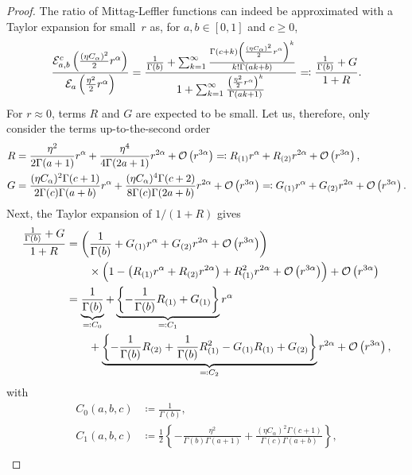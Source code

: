 \begin{proof}
The ratio of Mittag-Leffler functions can indeed be approximated with a Taylor expansion for small~$r$ as, for $a, b \in [0,1]$ and $c \geq 0$,
\[
\frac{\mathcal{E}_{a, b}^{c} \left(\frac{(\eta C_{\alpha})^2}2 r^\alpha\right)}{\mathcal{E}_a\left(\frac{\eta^2}2 r^\alpha\right)} = \frac{\frac{1}{\Gamma(b)} + \sum^{\infty}_{k=1}\frac{\Gamma(c+k) \left(\frac{(\eta C_{\alpha})^2}2 r^\alpha\right)^k}{k!\Gamma(ak+b)}}{1 + \sum^{\infty}_{k=1}\frac{\left(\frac{\eta^2}2 r^\alpha\right)^k}{\Gamma(ak+1)}} \eqqcolon \frac{\frac{1}{\Gamma(b)} + G}{1 + R}. 
\]
For $r \approx 0$, terms $R$ and $G$ are expected to be small. Let us, therefore, only consider the terms up-to-the-second order
\begin{align}
    R &= \frac{\eta^2}{2\Gamma(a+1)} r^\alpha + \frac{\eta^4}{4\Gamma(2a+1)}r^{2\alpha} + \mathcal{O}\left(r^{3\alpha}\right) \eqqcolon R_{(1)}r^\alpha + R_{(2)}r^{2\alpha} + \mathcal{O}\left(r^{3\alpha}\right), \\
    G &= \frac{(\eta C_{\alpha})^2 \Gamma(c+1)}{2\Gamma(c)\Gamma(a+b)} r^\alpha + \frac{(\eta C_{\alpha})^4 \Gamma(c+2)}{8 \Gamma(c) \Gamma(2a+b)}r^{2\alpha} + \mathcal{O}\left(r^{3\alpha}\right) \eqqcolon G_{(1)}r^\alpha + G_{(2)}r^{2\alpha} + \mathcal{O}\left(r^{3\alpha}\right).
\end{align}
Next, the Taylor expansion of $1/(1+R)$ gives
\begin{align}
    \frac{\frac{1}{\Gamma(b)} + G}{1 + R} &= \left(\frac{1}{\Gamma(b)} + G_{(1)}r^{\alpha} + G_{(2)}r^{2\alpha} + \mathcal{O}\left(r^{3\alpha}\right)\right) \\ & \qquad \times\left(1 - \left(R_{(1)}r^{\alpha} + R_{(2)}r^{2\alpha}\right) + R_{(1)}^2r^{2\alpha} + \mathcal{O}\left(r^{3\alpha}\right)\right) + \mathcal{O}\left(r^{3\alpha}\right) \\
    &= \underbrace{\frac{1}{\Gamma(b)}}_{\eqqcolon C_0} + \underbrace{\left\{- \frac{1}{\Gamma(b)} R_{(1)} + G_{(1)} \right\}}_{\eqqcolon C_1}r^{\alpha} \\ & \qquad + \underbrace{\left\{-\frac{1}{\Gamma(b)} R_{(2)} + \frac{1}{\Gamma(b)} R_{(1)}^2 - G_{(1)} R_{(1)} + G_{(2)}\right\}}_{\eqqcolon C_2}r^{2\alpha} + \mathcal{O}\left(r^{3\alpha}\right),
\end{align}
with
\begin{equation}
\begin{aligned}
    C_0(a,b,c) &\coloneqq \frac{1}{\Gamma(b)}, \\
    C_1(a,b,c) &\coloneqq \frac12\left\{-\frac{\eta^2}{\Gamma(b)\Gamma(a+1)} + \frac{(\eta C_{\alpha})^2 \Gamma(c+1)}{\Gamma(c)\Gamma(a+b)}\right\}, \\

\end{aligned}
\end{equation}
\end{proof}
